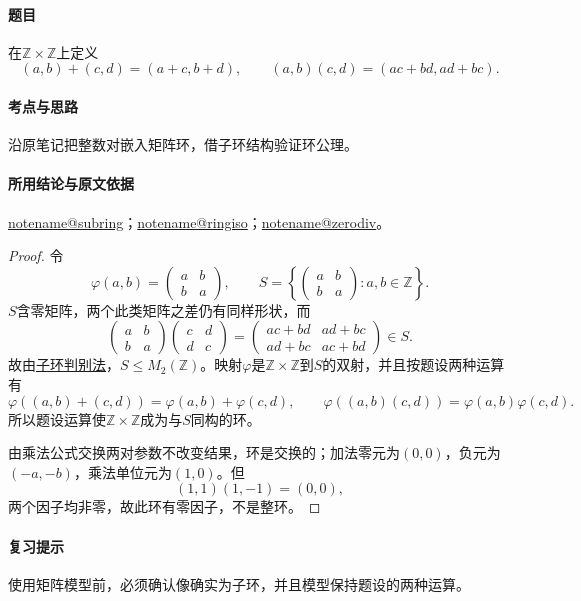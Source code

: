 \documentclass[UTF8,a4paper,11pt,fontset=windows]{ctexart}
\makeatletter
\newcommand{\Z}{\mathbb Z}\newcommand{\Q}{\mathbb Q}
\newcommand{\noteref}[1]{\hyperref[note:#1]{\csname notename@#1\endcsname}}
\newcommand{\proofref}[2]{\hyperref[note:#1]{#2}}
\newcommand{\exref}[2]{\hyperref[ex:#1:#2]{第#1章习题#2}}
\makeatother
\begin{document}
\paragraph{题目}
在$\Z\times\Z$上定义
\[
(a,b)+(c,d)=(a+c,b+d),\qquad(a,b)(c,d)=(ac+bd,ad+bc).
\]

\paragraph{考点与思路}
沿原笔记把整数对嵌入矩阵环，借子环结构验证环公理。

\paragraph{所用结论与原文依据}
\noteref{subring}；\noteref{ringiso}；\noteref{zerodiv}。


\begin{proof}
令
\[
\varphi(a,b)=\begin{pmatrix}a&b\\b&a\end{pmatrix},\qquad
S=\left\{\begin{pmatrix}a&b\\b&a\end{pmatrix}:a,b\in\Z\right\}.
\]
$S$含零矩阵，两个此类矩阵之差仍有同样形状，而
\[
\begin{pmatrix}a&b\\b&a\end{pmatrix}
\begin{pmatrix}c&d\\d&c\end{pmatrix}
=\begin{pmatrix}ac+bd&ad+bc\\ad+bc&ac+bd\end{pmatrix}\in S.
\]
故由\proofref{subring}{子环判别法}，$S\leq M_2(\Z)$。映射$\varphi$是$\Z\times\Z$到$S$的双射，并且按题设两种运算有
\[
\varphi((a,b)+(c,d))=\varphi(a,b)+\varphi(c,d),\qquad
\varphi((a,b)(c,d))=\varphi(a,b)\varphi(c,d).
\]
所以题设运算使$\Z\times\Z$成为与$S$同构的环。

由乘法公式交换两对参数不改变结果，环是交换的；加法零元为$(0,0)$，负元为$(-a,-b)$，乘法单位元为$(1,0)$。但
\[
(1,1)(1,-1)=(0,0),
\]
两个因子均非零，故此环有零因子，不是整环。
\end{proof}

\paragraph{复习提示}
使用矩阵模型前，必须确认像确实为子环，并且模型保持题设的两种运算。
\end{document}
